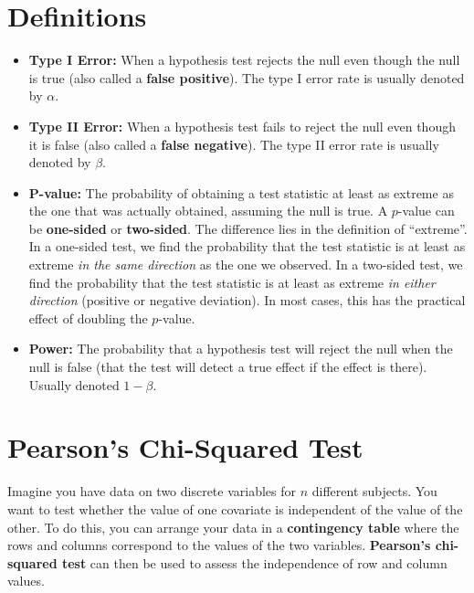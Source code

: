 
\section{Definitions}

\begin{itemize}
\item \textbf{Type I Error:} When a hypothesis test rejects the null even though the null is true (also called a \textbf{false positive}). The type I error rate is usually denoted by $\alpha$.
\item \textbf{Type II Error:} When a hypothesis test fails to reject the null even though it is false (also called a \textbf{false negative}). The type II error rate is usually denoted by $\beta$.
\item \textbf{P-value:} The probability of obtaining a test statistic at least as extreme as the one that was actually obtained, assuming the null is true. A $p$-value can be \textbf{one-sided} or \textbf{two-sided}. The difference lies in the definition of ``extreme''. In a one-sided test, we find the probability that the test statistic is at least as extreme \emph{in the same direction} as the one we observed. In a two-sided test, we find the probability that the test statistic is at least as extreme \emph{in either direction} (positive or negative deviation). In most cases, this has the practical effect of doubling the $p$-value.
\item \textbf{Power:} The probability that a hypothesis test will reject the null when the null is false (that the test will detect a true effect if the effect is there). Usually denoted $1 - \beta$.
\end{itemize}


\section{Pearson's Chi-Squared Test}

Imagine you have data on two discrete variables for $n$ different subjects. You want to test whether the value of one covariate is independent of the value of the other. To do this, you can arrange your data in a \textbf{contingency table} where the rows and columns correspond to the values of the two variables. \textbf{Pearson's chi-squared test} can then be used to assess the independence of row and column values.

